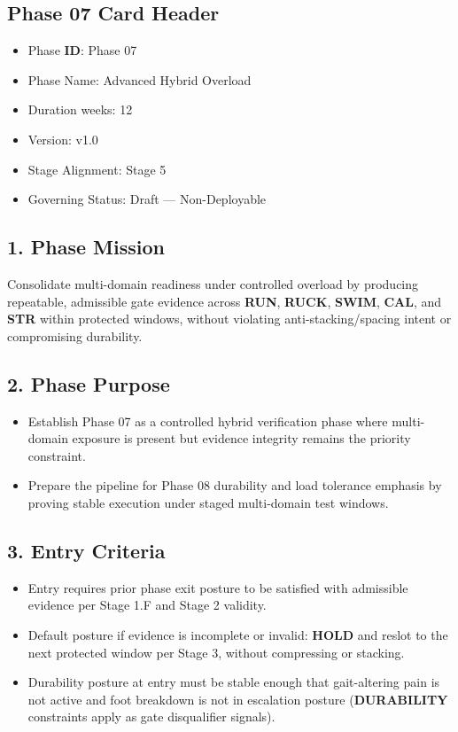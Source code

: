 \documentclass[10pt]{article}
\begin{document}
\subsection*{Phase 07 Card Header}
{}

\begin{itemize}
\item Phase \textbf{ID}: Phase 07
\item Phase Name: Advanced Hybrid Overload
\item Duration weeks: 12
\item Version: v1.0
\item Stage Alignment: Stage 5
\item Governing Status: Draft — Non-Deployable
\end{itemize}

\subsection*{1. Phase Mission}

Consolidate multi-domain readiness under controlled overload by producing repeatable, admissible gate evidence across \textbf{RUN}, \textbf{RUCK}, \textbf{SWIM}, \textbf{CAL}, and \textbf{STR} within protected windows, without violating anti-stacking/spacing intent or compromising durability.

\subsection*{2. Phase Purpose}

\begin{itemize}
\item Establish Phase 07 as a controlled hybrid verification phase where multi-domain exposure is present but evidence integrity remains the priority constraint.
\item Prepare the pipeline for Phase 08 durability and load tolerance emphasis by proving stable execution under staged multi-domain test windows.
\end{itemize}

\subsection*{3. Entry Criteria}

\begin{itemize}
\item Entry requires prior phase exit posture to be satisfied with admissible evidence per Stage 1.F and Stage 2 validity.
\item Default posture if evidence is incomplete or invalid: \textbf{HOLD} and reslot to the next protected window per Stage 3, without compressing or stacking.
\item Durability posture at entry must be stable enough that gait-altering pain is not active and foot breakdown is not in escalation posture (\textbf{DURABILITY} constraints apply as gate disqualifier signals).
\end{itemize}
\end{document}

